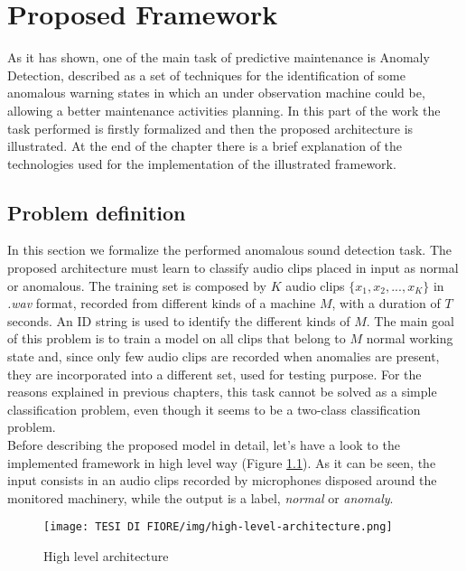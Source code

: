 \chapter{Proposed Framework}
As it has shown, one of the main task of predictive maintenance is Anomaly Detection, described as a set of techniques for the identification of some anomalous warning states in which an under observation machine could be, allowing a better maintenance activities planning. In this part of the work the task performed is firstly formalized and then the proposed architecture is illustrated. At the end of the chapter there is a brief explanation of the technologies used for the implementation of the illustrated framework.
\section{Problem definition}
In this section we formalize the performed anomalous sound detection task. The proposed architecture must learn to classify audio clips placed in input as normal or anomalous. The training set is composed by $K$ audio clips $\{x_1, x_2, ...,x_K\}$ in \textit{.wav} format, recorded from different kinds of a machine $M$, with a duration of $T$ seconds. An ID string is used to identify the different kinds of $M$. The main goal of this problem is to train a model on all clips that belong to $M$ normal working state and, since only few audio clips are recorded when anomalies are present, they are incorporated into a different set, used for testing purpose. For the reasons explained in previous chapters, this task cannot be solved as a simple classification problem, even though it seems to be a two-class classification problem.\\
Before describing the proposed model in detail, let’s have a look to the implemented framework in high level way (Figure \ref{high-level-architecture}). As it can be seen, the input consists in an audio clips recorded by microphones disposed around the monitored machinery, while the output is a label, \textit{normal} or \textit{anomaly}.
\begin{figure}[ht]
\texttt{[image: TESI DI FIORE/img/high-level-architecture.png]}
\centering
\caption{High level architecture \cite{DCASE}}
\label{high-level-architecture}
\end{figure}

